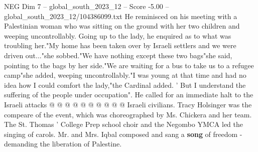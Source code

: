 \begin{textsample}{NEG Dim 7 – global\_south\_2023\_12 – Score -5.00 – global\_south\_2023\_12/104386099.txt}
He reminisced on his meeting with a Palestinian woman who was sitting on the ground with her two children and weeping uncontrollably.
Going up to the lady, he enquired as to what was troubling her."My home has been taken over by Israeli settlers and we were driven out..."she sobbed."We have nothing except these two bags"she said, pointing to the bags by her side."We are waiting for a bus to take us to a refugee camp"she added, weeping uncontrollably."I was young at that time and had no idea how I could comfort the lady,"the Cardinal added. ' But I understand the suffering of the people under occupation".
He called for an immediate halt to the Israeli attacks @ @ @ @ @ @ @ @ @ @ Israeli civilians.
Tracy Holsinger was the compeare of the event, which was choreographed by Ms.
Chickera and her team.
The St.
Thomas ' College Prep school choir and the Negombo YMCA led the singing of carols.
Mr. and Mrs.
Iqbal composed and sang a \textbf{song} of freedom -demanding the liberation of Palestine.

\end{textsample}
